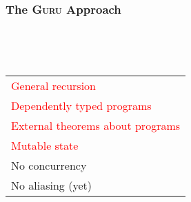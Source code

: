 \documentclass[11pt]{beamer}
\begin{document}
\begin{frame}
  \frametitle{The \textsc{Guru} Approach}

\begin{center}

\ 

\ \ \ \ \ \ \ \ \ \ \ \ \ \ \ \ \ \ \ 
\begin{tabular}{l}
\textcolor{red}{General recursion} \\
\textcolor{red}{Dependently typed programs} \\
\textcolor{red}{External theorems about programs }\\
\textcolor{red}{Mutable state} \\
No concurrency \\ 
No aliasing (yet)
\end{tabular}

\end{center}

\end{frame}
\end{document}
